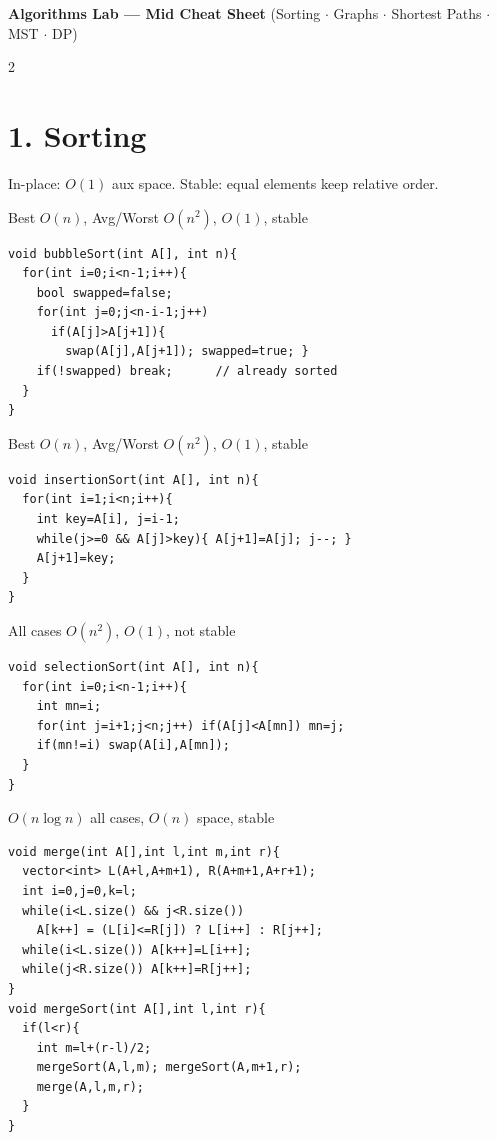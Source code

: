 \documentclass[12pt,landscape,a4paper]{extarticle}
\newcommand{\algo}[2]{\vspace{1pt}{\bfseries #1}\hfill{\footnotesize\color{cx}#2}\par\vspace{-1pt}}
\begin{document}
\begin{center}
{\Large\bfseries\color{hd}Algorithms Lab --- Mid Cheat Sheet}\quad
{\footnotesize (Sorting $\cdot$ Graphs $\cdot$ Shortest Paths $\cdot$ MST $\cdot$ DP)}
\end{center}
\vspace{-4pt}

\begin{multicols}{2}

\section*{1. Sorting}
{\footnotesize In-place: $O(1)$ aux space. Stable: equal elements keep relative order.}

\algo{Bubble Sort}{Best $O(n)$, Avg/Worst $O(n^2)$, $O(1)$, stable}
\begin{lstlisting}
void bubbleSort(int A[], int n){
  for(int i=0;i<n-1;i++){
    bool swapped=false;
    for(int j=0;j<n-i-1;j++)
      if(A[j]>A[j+1]){
        swap(A[j],A[j+1]); swapped=true; }
    if(!swapped) break;      // already sorted
  }
}
\end{lstlisting}

\algo{Insertion Sort}{Best $O(n)$, Avg/Worst $O(n^2)$, $O(1)$, stable}
\begin{lstlisting}
void insertionSort(int A[], int n){
  for(int i=1;i<n;i++){
    int key=A[i], j=i-1;
    while(j>=0 && A[j]>key){ A[j+1]=A[j]; j--; }
    A[j+1]=key;
  }
}
\end{lstlisting}

\algo{Selection Sort}{All cases $O(n^2)$, $O(1)$, not stable}
\begin{lstlisting}
void selectionSort(int A[], int n){
  for(int i=0;i<n-1;i++){
    int mn=i;
    for(int j=i+1;j<n;j++) if(A[j]<A[mn]) mn=j;
    if(mn!=i) swap(A[i],A[mn]);
  }
}
\end{lstlisting}

\algo{Merge Sort}{$O(n\log n)$ all cases, $O(n)$ space, stable}
\begin{lstlisting}
void merge(int A[],int l,int m,int r){
  vector<int> L(A+l,A+m+1), R(A+m+1,A+r+1);
  int i=0,j=0,k=l;
  while(i<L.size() && j<R.size())
    A[k++] = (L[i]<=R[j]) ? L[i++] : R[j++];
  while(i<L.size()) A[k++]=L[i++];
  while(j<R.size()) A[k++]=R[j++];
}
void mergeSort(int A[],int l,int r){
  if(l<r){
    int m=l+(r-l)/2;
    mergeSort(A,l,m); mergeSort(A,m+1,r);
    merge(A,l,m,r);
  }
}
\end{lstlisting}


\end{multicols}
\end{document}
